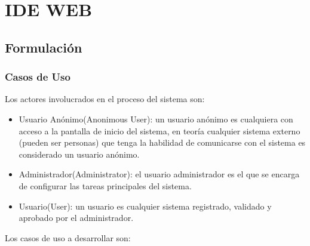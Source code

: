 \section{IDE WEB}
\subsection{Formulación}
\subsubsection{Casos de Uso}

Los actores involucrados en el proceso del sistema son:

\begin{itemize}

	\item{Usuario Anónimo}(Anonimous User): un usuario anónimo es cualquiera con acceso a la pantalla de inicio del sistema, en teoría cualquier sistema externo (pueden ser personas) que tenga la habilidad de comunicarse con el sistema es considerado un usuario anónimo.
	
	\item{Administrador}(Administrator): el usuario administrador es el que se encarga de configurar las tareas principales del sistema.
	
	\item{Usuario}(User): un usuario es cualquier sistema registrado, validado y aprobado por el administrador.

\end{itemize}

Los casos de uso a desarrollar son:

